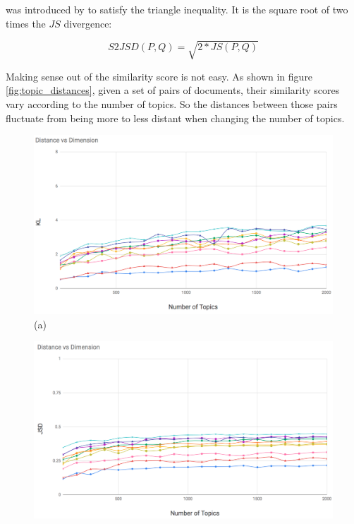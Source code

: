  was introduced by \cite{Endres2003} to satisfy the triangle inequality. It is the square root of two times the $JS$ divergence:

\begin{equation}
    S2JSD(P,Q) = \sqrt{2*JS(P,Q)}
\label{eq:s2jsd}
\end{equation}

Making sense out of the similarity score is not easy. As shown in figure \ref{fig:topic_distances}, given a set of pairs of documents, their similarity scores vary according to the number of topics. So the distances between those pairs fluctuate from being more to less distant when changing the number of topics.
\begin{figure}
\begin{center}
\begin{adjustbox}{minipage=0.45\linewidth,frame=0pt 3pt}
\includegraphics[width=\linewidth]{KL_100_2k.png}
\centering (a)
\end{adjustbox}
\hfill
\begin{adjustbox}{minipage=0.45\linewidth,frame=0pt 3pt}
\includegraphics[width=\linewidth]{JSD_100_2k.png}

\end{adjustbox}
\end{center}
\end{figure}
